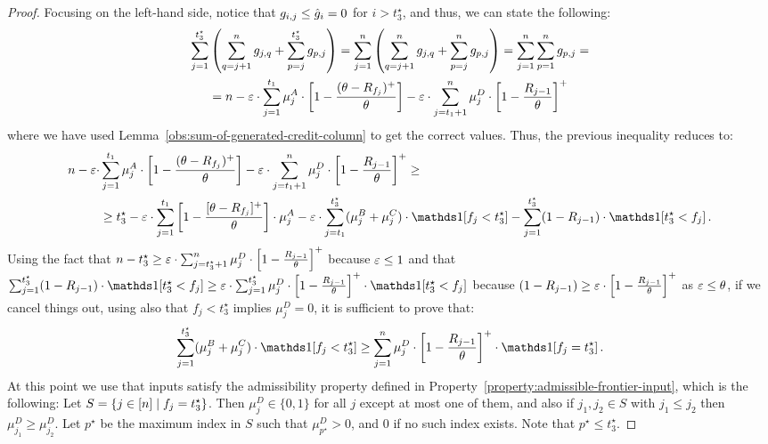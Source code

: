 \begin{proof}
    Focusing on the left-hand side, notice that $g_{i,j}\leq \hat{g}_i = 0$ for $i>t_3^\star$, and thus, we can state the following:
    \begin{align*}
        \sum_{j=1}^{t_3^\star} &\left(\sum_{q=j+1}^{n} g_{j,q} + \sum_{p=j}^{t_3^\star} g_{p,j} \right) 
        =\sum_{j=1}^n \left(\sum_{q=j+1}^{n} g_{j,q} + \sum_{p=j}^{n} g_{p,j} \right) 
        = \sum_{j=1}^n \sum_{p=1}^{n} g_{p,j}= \\
        &= n - \varepsilon\cdot \sum_{j=1}^{t_1} \mu_j^A \cdot\left[1 -\frac{(\theta-R_{f_j})^+}{\theta}\right] - \varepsilon\cdot \sum_{j=t_1+1}^n \mu_j^D \cdot\left[1 -\frac{R_{j-1}}{\theta}\right]^+
    \end{align*}
    where we have used Lemma~\ref{obs:sum-of-generated-credit-column} to get the correct values. Thus, the previous inequality reduces to:
    \begin{align*}
        n - \Mcoeffmone\cdot &\sum_{j=1}^{t_1} \mu_j^A \cdot\left[1 -\frac{(\MRttwo-R_{f_j})^+}{\MRttwo}\right]- \Mcoeffmone\cdot \sum_{j=t_1+1}^n \mu_j^D \cdot\left[1 -\frac{R_{j-1}}{\MRttwo}\right]^+ \geq \\
        &\geq t_3^\star - \Mcoeffmone\cdot \sum_{j=1}^{t_1}\left[1-\frac{[\MRttwo-R_{f_j}]^+}{\MRttwo}\right] \cdot \mu_j^A 
        - \Mcoeffmone \cdot \sum_{j=t_1}^{t_3^\star}(\mu_j^B+\mu_j^C)\cdot \ind[f_j<t_3^\star] 
        - \sum_{j=1}^{t_3^\star}(1-R_{j-1}) \cdot \ind[t_3^\star<f_j]\,.
    \end{align*}
    Using the fact that $n-t_3^\star \geq \varepsilon\cdot \sum_{j=t_3^\star+1}^n \mu_j^D \cdot\left[1 -\frac{R_{j-1}}{\theta}\right]^+$ because $\varepsilon \leq 1$ and that $\sum_{j=1}^{t_3^\star}(1-R_{j-1})\cdot \ind[t_3^\star<f_j] \geq \Mcoeffmone\cdot \sum_{j=1}^{t_3^\star} \mu_j^D \cdot\left[1 -\frac{R_{j-1}}{\MRttwo}\right]^+ \cdot \ind[t_3^\star<f_j]$ because $(1-R_{j-1})\geq \varepsilon \cdot\left[1 -\frac{R_{j-1}}{\theta}\right]^+$ as $\varepsilon\leq \theta$, if we cancel things out, using also that $f_j < t_3^\star$ implies $\mu_j^D =0$, it is sufficient to prove that:
    \begin{align*}
        \sum_{j=1}^{t_3^\star}(\mu_j^B+\mu_j^C)\cdot \ind[f_j<t_3^\star] \geq 
         \sum_{j=1}^n \mu_j^D \cdot\left[1 -\frac{R_{j-1}}{\MRttwo}\right]^+ \cdot \ind[f_j=t_3^\star]\,.
    \end{align*}
    At this point we use that inputs satisfy the admissibility property defined in Property~\ref{property:admissible-frontier-input}, which is the following:
    Let $S = \left\{j \in [n] \mid f_j = t_3^\star\right\}$. Then $\mu_j^D \in \{0, 1\}$ for all $j$ except at most one of them, and also if $j_1, j_2 \in S$ with $j_1 \leq j_2$ then $\mu_{j_1}^D \geq \mu_{j_2}^D$. Let $p^\star$ be the maximum index in $S$ such that $\mu_{p^\star}^D > 0$, and $0$ if no such index exists. Note that $p^\star \leq t_3^\star$.

\end{proof}
